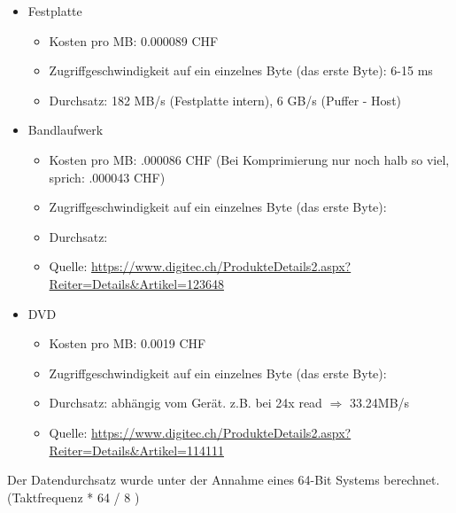 \documentclass[10pt]{article}
\begin{document}
\begin{enumerate}[label=\alph*)]
\begin{itemize}
					
				\item Festplatte
					\begin{itemize}
						\item Kosten pro MB: 0.000089 CHF
						\item Zugriffgeschwindigkeit auf ein einzelnes Byte (das erste Byte): 6-15 ms
						\item Durchsatz: 182 MB/s (Festplatte intern), 6 GB/s (Puffer - Host)
					\end{itemize}
				\item Bandlaufwerk
					\begin{itemize}
						\item Kosten pro MB: .000086 CHF (Bei Komprimierung nur noch halb so viel, sprich: .000043 CHF)
						\item Zugriffgeschwindigkeit auf ein einzelnes Byte (das erste Byte):
						\item Durchsatz:
						\item Quelle: \url{https://www.digitec.ch/ProdukteDetails2.aspx?Reiter=Details&Artikel=123648}
					\end{itemize}
					
				\item DVD
					\begin{itemize}
						\item Kosten pro MB: 0.0019 CHF
						\item Zugriffgeschwindigkeit auf ein einzelnes Byte (das erste Byte):
						\item Durchsatz: abhängig vom Gerät. z.B. bei 24x read $\Rightarrow$ 33.24MB/s
						\item Quelle: \url{https://www.digitec.ch/ProdukteDetails2.aspx?Reiter=Details&Artikel=114111}
					\end{itemize}
			\end{itemize}	
			Der Datendurchsatz wurde unter der Annahme eines 64-Bit Systems berechnet. (Taktfrequenz * 64 / 8 )

\end{enumerate}
\end{document}
